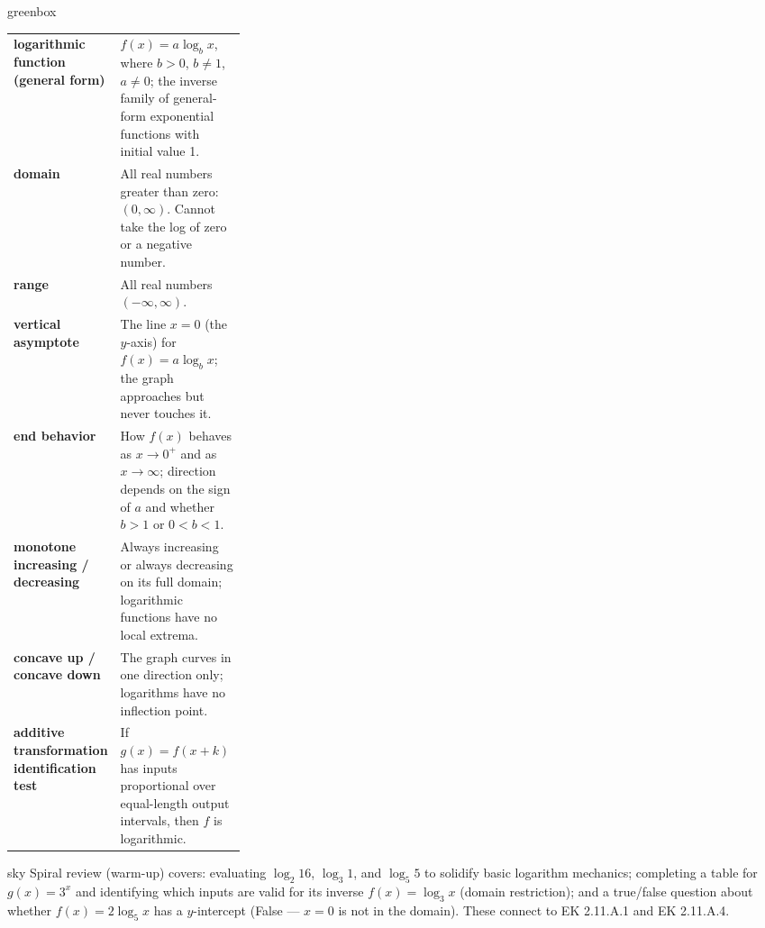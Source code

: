 \documentclass[10pt]{article}
\begin{document}
\begin{skillbox}{greenbox}
\renewcommand{\arraystretch}{1.4}
\begin{tabularx}{\linewidth}{@{} >{\bfseries\color{navy}}p{0.30\linewidth} X @{}}
logarithmic function (general form) & $f(x) = a\log_b x$, where $b>0$, $b\ne1$, $a\ne0$;
                                      the inverse family of general-form exponential functions
                                      with initial value 1. \\
domain & All real numbers greater than zero: $(0, \infty)$.
         Cannot take the log of zero or a negative number. \\
range & All real numbers $(-\infty, \infty)$. \\
vertical asymptote & The line $x = 0$ (the $y$-axis) for $f(x) = a\log_b x$;
                     the graph approaches but never touches it. \\
end behavior & How $f(x)$ behaves as $x\to 0^+$ and as $x\to\infty$;
               direction depends on the sign of $a$ and whether $b>1$ or $0<b<1$. \\
monotone increasing / decreasing & Always increasing or always decreasing on its full domain;
                                   logarithmic functions have no local extrema. \\
concave up / concave down & The graph curves in one direction only; logarithms have no
                            inflection point. \\
additive transformation identification test & If $g(x) = f(x+k)$ has inputs proportional over
                            equal-length output intervals, then $f$ is logarithmic. \\
\end{tabularx}
\end{skillbox}

\begin{skillbox}{sky}
    Spiral review (warm-up) covers: evaluating $\log_2 16$, $\log_3 1$, and $\log_5 5$ to
    solidify basic logarithm mechanics; completing a table for $g(x) = 3^x$ and identifying
    which inputs are valid for its inverse $f(x) = \log_3 x$ (domain restriction); and a
    true/false question about whether $f(x) = 2\log_5 x$ has a $y$-intercept (False ---
    $x = 0$ is not in the domain). These connect to EK 2.11.A.1 and EK 2.11.A.4.
\end{skillbox}
\end{document}
